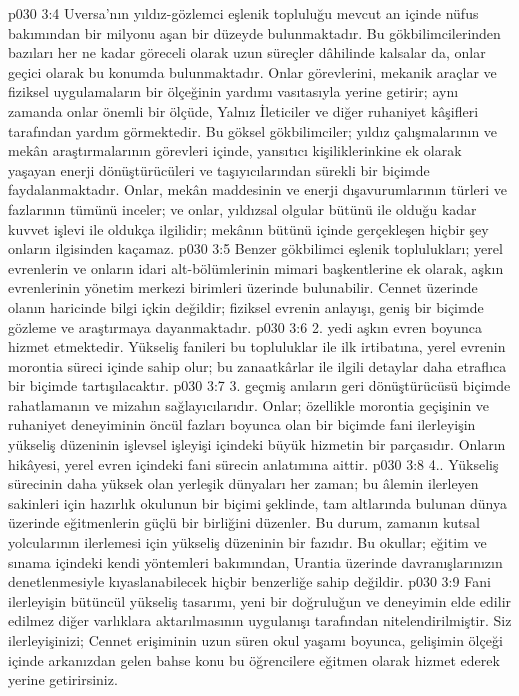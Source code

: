 \vs p030 3:4 Uversa’nın yıldız\hyp{}gözlemci eşlenik topluluğu mevcut an içinde nüfus bakımından bir milyonu aşan bir düzeyde bulunmaktadır. Bu gökbilimcilerinden bazıları her ne kadar göreceli olarak uzun süreçler dâhilinde kalsalar da, onlar geçici olarak bu konumda bulunmaktadır. Onlar görevlerini, mekanik araçlar ve fiziksel uygulamaların bir ölçeğinin yardımı vasıtasıyla yerine getirir; aynı zamanda onlar önemli bir ölçüde, Yalnız İleticiler ve diğer ruhaniyet kâşifleri tarafından yardım görmektedir. Bu göksel gökbilimciler; yıldız çalışmalarının ve mekân araştırmalarının görevleri içinde, yansıtıcı kişiliklerinkine ek olarak yaşayan enerji dönüştürücüleri ve taşıyıcılarından sürekli bir biçimde faydalanmaktadır. Onlar, mekân maddesinin ve enerji dışavurumlarının türleri ve fazlarının tümünü inceler; ve onlar, yıldızsal olgular bütünü ile olduğu kadar kuvvet işlevi ile oldukça ilgilidir; mekânın bütünü içinde gerçekleşen hiçbir şey onların ilgisinden kaçamaz.
\vs p030 3:5 Benzer gökbilimci eşlenik toplulukları; yerel evrenlerin ve onların idari alt\hyp{}bölümlerinin mimari başkentlerine ek olarak, aşkın evrenlerinin yönetim merkezi birimleri üzerinde bulunabilir. Cennet üzerinde olanın haricinde bilgi içkin değildir; fiziksel evrenin anlayışı, geniş bir biçimde gözleme ve araştırmaya dayanmaktadır.
\vs p030 3:6 2.\bibnobreakspace {} yedi aşkın evren boyunca hizmet etmektedir. Yükseliş fanileri bu topluluklar ile ilk irtibatına, yerel evrenin morontia süreci içinde sahip olur; bu zanaatkârlar ile ilgili detaylar daha etraflıca bir biçimde tartışılacaktır.
\vs p030 3:7 3.\bibnobreakspace {} geçmiş anıların geri dönüştürücüsü biçimde rahatlamanın ve mizahın sağlayıcılarıdır. Onlar; özellikle morontia geçişinin ve ruhaniyet deneyiminin öncül fazları boyunca olan bir biçimde fani ilerleyişin yükseliş düzeninin işlevsel işleyişi içindeki büyük hizmetin bir parçasıdır. Onların hikâyesi, yerel evren içindeki fani sürecin anlatımına aittir.
\vs p030 3:8 4.\bibnobreakspace {}. Yükseliş sürecinin daha yüksek olan yerleşik dünyaları her zaman; bu âlemin ilerleyen sakinleri için hazırlık okulunun bir biçimi şeklinde, tam altlarında bulunan dünya üzerinde eğitmenlerin güçlü bir birliğini düzenler. Bu durum, zamanın kutsal yolcularının ilerlemesi için yükseliş düzeninin bir fazıdır. Bu okullar; eğitim ve sınama içindeki kendi yöntemleri bakımından, Urantia üzerinde davranışlarınızın denetlenmesiyle kıyaslanabilecek hiçbir benzerliğe sahip değildir.
\vs p030 3:9 Fani ilerleyişin bütüncül yükseliş tasarımı, yeni bir doğruluğun ve deneyimin elde edilir edilmez diğer varlıklara aktarılmasının uygulanışı tarafından nitelendirilmiştir. Siz ilerleyişinizi; Cennet erişiminin uzun süren okul yaşamı boyunca, gelişimin ölçeği içinde arkanızdan gelen bahse konu bu öğrencilere eğitmen olarak hizmet ederek yerine getirirsiniz.
